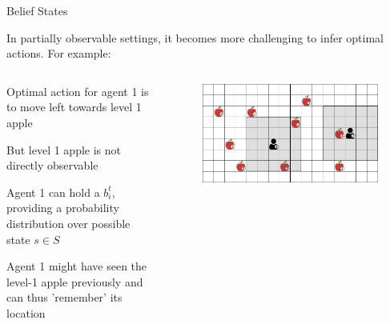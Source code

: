 \begin{frame}{Belief States}

    In partially observable settings, it becomes more challenging to infer optimal actions. For example:

    \begin{columns}
    \begin{column}{0.6\textwidth}
    \vspace{10pt}
        \blist 
            \item Optimal action for agent 1 is to move left towards level 1 apple
            \item But level 1 apple is not directly observable 
            \item Agent 1 can hold a  \(b_{i}^{t}\), providing a probability distribution over possible state \(s \in S\)
            \item Agent 1 might have seen the level-1 apple previously and can thus 'remember' its location
        \elist  
    \end{column}
    \begin{column}{0.4\textwidth}
    \begin{figure}
        \centering
        \includegraphics[width = \linewidth]{images/environments/lbf/foraging_po.png}
    \end{figure}
    \end{column}
    \end{columns}   
\end{frame}

